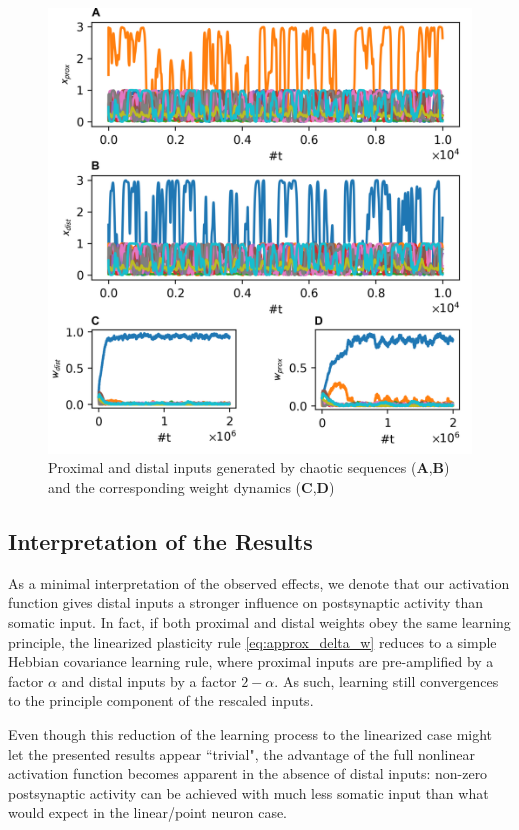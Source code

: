 \documentclass[10pt,a4paper]{article}
\begin{document}
\begin{figure}
\centering
\includegraphics[width=\textwidth]{./figures/dist_plast_comp.png}
\caption{Proximal and distal inputs generated by chaotic sequences ({\bf A},{\bf B}) and the corresponding weight dynamics ({\bf C},{\bf D})}
\label{fig:dist_plast_comp}
\end{figure}

\subsection{Interpretation of the Results}

As a minimal interpretation of the observed effects, we denote that our activation function gives distal inputs a stronger influence on postsynaptic activity than somatic input. In fact, if both proximal and distal weights obey the same learning principle, the linearized plasticity rule \eqref{eq:approx_delta_w} reduces to a simple Hebbian covariance learning rule, where proximal inputs are pre-amplified by a factor $\alpha$ and distal inputs by a factor $2-\alpha$. As such, learning still convergences to the principle component of the rescaled inputs.

Even though this reduction of the learning process to the linearized case might let the presented results appear ``trivial", the advantage of the full nonlinear activation function becomes apparent in the absence of distal inputs: non-zero postsynaptic activity can be achieved with much less somatic input than what would expect in the linear/point neuron case.
\end{document}
